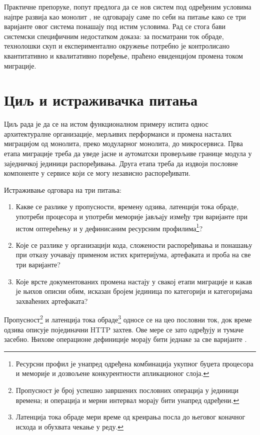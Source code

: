 \documentclass[12pt,oneside]{memoir}
\begin{document}
Практичне препоруке, попут предлога да се нов систем под одређеним условима
најпре развија као монолит \cite{fowler2015monolithfirst}, не одговарају саме
по себи на питање како се три варијанте овог система понашају под истим
условима. Рад се стога бави системски специфичним недостатком доказа: за
посматрани ток обраде, технолошки скуп и експериментално окружење потребно је
контролисано квантитативно и квалитативно поређење, праћено евиденцијом промена
током миграције.

\section{Циљ и истраживачка питања}

Циљ рада је да се на истом функционалном примеру испита однос архитектуралне
организације, мерљивих перформанси и промена насталих миграцијом од монолита,
преко модуларног монолита, до микросервиса. Прва етапа миграције треба да уведе
јасне и аутоматски проверљиве границе модула у заједничкој јединици
распоређивања. Друга етапа треба да издвоји пословне компоненте у сервисе који
се могу независно распоређивати.

Истраживање одговара на три питања:
\begin{enumerate}
	\item[ИП1.] Какве се разлике у пропусности, времену одзива, латенцији тока
		обраде, употреби процесора и употреби меморије јављају између три
		варијанте при истом оптерећењу и у дефинисаним ресурсним
		профилима\footnote{Ресурсни профил је унапред одређена комбинација
			укупног буџета процесора и меморије и дозвољене конкурентности
			апликационог слоја.}?
	\item[ИП2.] Које се разлике у организацији кода, сложености распоређивања и
		понашању при отказу уочавају применом истих критеријума, артефаката и
		проба на све три варијанте?
	\item[ИП3.] Које врсте документованих промена настају у свакој етапи
		миграције и какав је њихов описни обим, исказан бројем јединица по
		категорији и категоријама захваћених артефаката?
\end{enumerate}

Пропусност\footnote{Пропусност је број успешно завршених пословних операција у
	јединици времена; и операција и мерни интервал морају бити унапред одређени.}
и латенција тока обраде\footnote{Латенција тока обраде мери време од креирања
	посла до његовог коначног исхода и обухвата чекање у реду.} односе се на цео
пословни ток, док време одзива описује појединачни {\lat HTTP} захтев. Ове мере
се зато одређују и тумаче засебно. Њихове операционе дефиниције морају бити
једнаке за све варијанте \cite{jain1991art,kounev2020benchmarking}.
\end{document}
